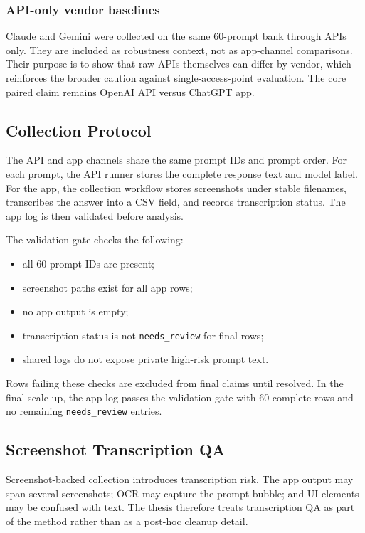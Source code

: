 \subsubsection{API-only vendor baselines}

Claude and Gemini were collected on the same 60-prompt bank through APIs only.
They are included as robustness context, not as app-channel comparisons. Their
purpose is to show that raw APIs themselves can differ by vendor, which reinforces
the broader caution against single-access-point evaluation. The core paired
claim remains OpenAI API versus ChatGPT app.

\subsection{Collection Protocol}

The API and app channels share the same prompt IDs and prompt order. For each
prompt, the API runner stores the complete response text and model label. For
the app, the collection workflow stores screenshots under stable filenames,
transcribes the answer into a CSV field, and records transcription status. The
app log is then validated before analysis.

The validation gate checks the following:

\begin{itemize}
  \item all 60 prompt IDs are present;
  \item screenshot paths exist for all app rows;
  \item no app output is empty;
  \item transcription status is not \texttt{needs\_review} for final rows;
  \item shared logs do not expose private high-risk prompt text.
\end{itemize}

Rows failing these checks are excluded from final claims until resolved. In the
final scale-up, the app log passes the validation gate with 60 complete rows and
no remaining \texttt{needs\_review} entries.

\subsection{Screenshot Transcription QA}

Screenshot-backed collection introduces transcription risk. The app output may
span several screenshots; OCR may capture the prompt bubble; and UI elements may
be confused with text. The thesis therefore treats transcription QA as part of
the method rather than as a post-hoc cleanup detail.

